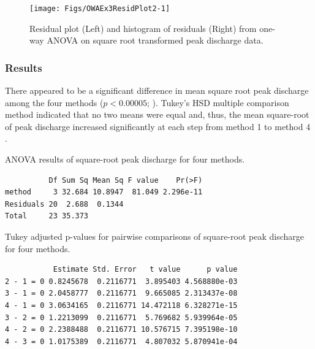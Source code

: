 \documentclass[10pt,openany]{book}\usepackage[]{graphicx}\usepackage[]{color}
\makeatletter
\newenvironment{kframe}{%
 \def\at@end@of@kframe{}%
 \ifinner\ifhmode%
  \def\at@end@of@kframe{\end{minipage}}%
  \begin{minipage}{\columnwidth}%
 \fi\fi%
 \def\FrameCommand##1{\hskip\@totalleftmargin \hskip-\fboxsep
 \colorbox{shadecolor}{##1}\hskip-\fboxsep
     \hskip-\linewidth \hskip-\@totalleftmargin \hskip\columnwidth}%
 \MakeFramed {\advance\hsize-\width
   \@totalleftmargin\z@ \linewidth\hsize
   \@setminipage}}%
 {\par\unskip\endMakeFramed%
 \at@end@of@kframe}
\newenvironment{knitrout}{}{} %
\makeatother
\begin{document}
\begin{knitrout}
\color{fgcolor}\begin{figure}[hbtp]

{\centering \texttt{[image: Figs/OWAEx3ResidPlot2-1]} 

}

\caption[Residual plot (Left) and histogram of residuals (Right) from one-way ANOVA on square root transformed peak discharge data]{Residual plot (Left) and histogram of residuals (Right) from one-way ANOVA on square root transformed peak discharge data.}\label{fig:OWAEx3ResidPlot2}
\end{figure}


\end{knitrout}

\subsubsection*{Results}
There appeared to be a significant difference in mean square root peak discharge among the four methods ($p<0.00005$; ).  Tukey's HSD multiple comparison method indicated that no two means were equal  and, thus, the mean square-root of peak discharge increased significantly at each step from method 1 to  method 4 .

\begin{table}[h]
  \centering
  \caption{ANOVA results of square-root peak discharge for four methods.}\label{tab:OWAEx3Results1}
\begin{knitrout}
\color{fgcolor}\begin{kframe}
\begin{verbatim}
          Df Sum Sq Mean Sq F value    Pr(>F)
method     3 32.684 10.8947  81.049 2.296e-11
Residuals 20  2.688  0.1344                  
Total     23 35.373                          
\end{verbatim}
\end{kframe}
\end{knitrout}
\end{table}

\begin{table}[h]
  \centering
  \caption{Tukey adjusted p-values for pairwise comparisons of square-root peak discharge for four methods.}\label{tab:OWAEx3Results2}
\begin{knitrout}
\color{fgcolor}\begin{kframe}
\begin{verbatim}
           Estimate Std. Error   t value      p value
2 - 1 = 0 0.8245678  0.2116771  3.895403 4.568880e-03
3 - 1 = 0 2.0458777  0.2116771  9.665085 2.313437e-08
4 - 1 = 0 3.0634165  0.2116771 14.472118 6.328271e-15
3 - 2 = 0 1.2213099  0.2116771  5.769682 5.939964e-05
4 - 2 = 0 2.2388488  0.2116771 10.576715 7.395198e-10
4 - 3 = 0 1.0175389  0.2116771  4.807032 5.870941e-04
\end{verbatim}
\end{kframe}
\end{knitrout}
\end{table}
\end{document}
